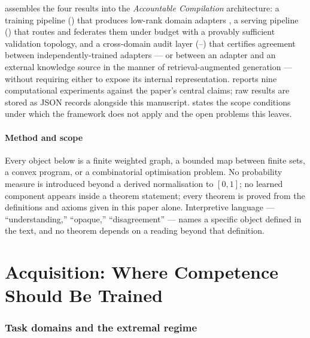 \documentclass[11pt,twocolumn,a4paper]{article}
\theoremstyle{rdm}
\theoremstyle{definition}
\theoremstyle{remark}
\begin{document}
 assembles the four results into the \emph{Accountable
Compilation} architecture: a training pipeline () that
produces low-rank domain adapters \citep{hu2022lora,houlsby2019}, a serving
pipeline () that routes and federates them under budget
with a provably sufficient validation topology, and a cross-domain audit
layer (--) that certifies agreement
between independently-trained adapters --- or between an adapter and an
external knowledge source in the manner of retrieval-augmented generation
\citep{lewis2020rag} --- without requiring either to expose its internal
representation.  reports nine computational experiments
against the paper's central claims; raw results are stored as JSON records
alongside this manuscript.  states the scope conditions
under which the framework does not apply and the open problems this leaves.

\subsection{Method and scope}

Every object below is a finite weighted graph, a bounded map between finite
sets, a convex program, or a combinatorial optimisation problem. No
probability measure is introduced beyond a derived normalisation to
$[0,1]$; no learned component appears inside a theorem statement; every
theorem is proved from the definitions and axioms given in this paper alone.
Interpretive language --- ``understanding,'' ``opaque,'' ``disagreement''
--- names a specific object defined in the text, and no theorem depends on a
reading beyond that definition.


\part{Acquisition: Where Competence Should Be Trained}
\label{part:acquire}

\section{Task domains and the extremal regime}
\label{sec:domains}
\end{document}
